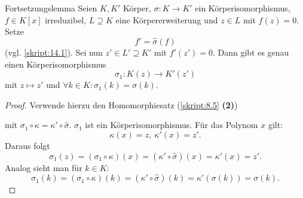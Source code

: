 \begin{genericdf}{Fortsetzungslemma}\label{skript:14.4}
	Seien $K,K'$ Körper, $\sigma: K \to K'$ ein Körperisomorphismus, $f \in K[x]$ irreduzibel, $L\supseteq K$ eine Körpererweiterung und $z \in L $ mit $f(z)=0$. Setze
	\[f'=\hat{\sigma}(f)\]
	(vgl. \ref{skript:14.1}). Sei nun $z'\in L'\supseteq K'$ mit $f'(z')=0$. Dann gibt es genau einen Körperisomorphismus
	\[\sigma_1: K(z)\to K'(z')\]
	mit $z\mapsto z'$ und $\forall k\in K: \sigma_1(k)=\sigma(k)$.
\end{genericdf}
\begin{proof}
	Verwende hierzu den Homomorphiesatz (\ref{skript:8.5} \textbf{(2)})
	\begin{center}
	\end{center}
	mit $\sigma_1\circ\kappa=\kappa'\circ\hat{\sigma}$. $\sigma_1$ ist ein Körperisomorphismus. Für das Polynom $x$ gilt:
	\[\kappa(x)=z,\ \kappa'(x)=z'.\]
	Daraus folgt
	\[\sigma_1(z)=(\sigma_1\circ\kappa)(x)=(\kappa'\circ\hat{\sigma})(x)=\kappa'(x)=z'.\]
	Analog sieht man für $k\in K$:
	\[\sigma_1(k)=(\sigma_1\circ\kappa)(k)=(\kappa'\circ\hat{\sigma})(k)=\kappa'(\sigma(k))=\sigma(k).\]
\end{proof}

